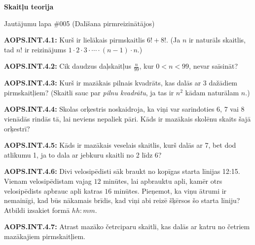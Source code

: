 \documentclass[11pt]{article}
\newenvironment{uzdevums}[1][\unskip]{%
\vspace{3mm}
\noindent
\textbf{#1:}
\noindent}
{}
\begin{document}
\begin{center}
{\LARGE \bf Skaitļu teorija}
\end{center}

\begin{center}
{\large Jautājumu lapa \#005 (Dalīšana pirmreizinātājos)}
\end{center}


\begin{uzdevums}[AOPS.INT.4.1]
Kurš ir lielākais pirmskaitlis $6! + 8!$. (Ja $n$ ir naturāls skaitlis, tad $n!$ ir reizinājums 
$1\cdot 2\cdot 3\cdot \cdots \cdot (n-1)\cdot n$.)
\end{uzdevums}


\begin{uzdevums}[AOPS.INT.4.2]
Cik daudzus daļskaitļus $\frac{n}{99}$, kur $0<n<99$, nevar saīsināt? 
\end{uzdevums}


\begin{uzdevums}[AOPS.INT.4.3]
Kurš ir mazākais pilnais kvadrāts, kas dalās ar 3 dažādiem pirmskaitļiem? (Skaitli sauc par {\em pilnu kvadrātu}, ja tas ir $n^2$ kādam naturālam $n$.)
\end{uzdevums}


\begin{uzdevums}[AOPS.INT.4.4]
Skolas orķestris noskaidroja, ka viņi var sarindoties 6, 7 vai 8 vienādās rindās tā, lai neviens nepaliek pāri. 
Kāds ir mazākais skolēnu skaits šajā orķestrī?
\end{uzdevums}


\begin{uzdevums}[AOPS.INT.4.5]
Kāds ir mazākais veselais skaitlis, kurš dalās ar 7, bet dod atlikumu 1, ja to dala ar jebkuru skaitli no 2 līdz 6? 
\end{uzdevums}


\begin{uzdevums}[AOPS.INT.4.6]
Divi velosipēdisti sāk braukt no kopīgas starta līnijas 12:15. Vienam velosipēdistam vajag $12$ minūtes, lai apbrauktu apli, 
kamēr otrs velosipēdists apbrauc apli katras $16$ minūtes. Pieņemot, ka viņu ātrumi ir nemainīgi, kad būs nākamais brīdis, kad 
viņi abi reizē šķērsos šo starta līniju? Atbildi izsakiet formā $hh:mm$. 
\end{uzdevums}

\begin{uzdevums}[AOPS.INT.4.7]
Atrast mazāko četrciparu skaitli, kas dalās ar katru no četriem mazākajiem pirmskaitļiem. 
\end{uzdevums}
\end{document}
